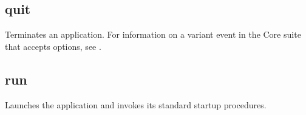 \documentclass[letterpaper,12pt,english,openany,oneside]{sphinxmanual}
\begin{document}
\subsection{quit}
\label{\detokenize{IAC_API_AppleEvtObjects:quit}}
Terminates an application. For information on a variant event in the Core suite that accepts options, see .


\begin{sphinxVerbatim}[commandchars=\\\{\}]
\end{sphinxVerbatim}




\subsection{run}
\label{\detokenize{IAC_API_AppleEvtObjects:run}}
Launches the application and invokes its standard startup procedures.

\label{\detokenize{IAC_API_AppleEvtObjects:syntax-1}}

\begin{sphinxVerbatim}[commandchars=\\\{\}]
\end{sphinxVerbatim}
\end{document}
